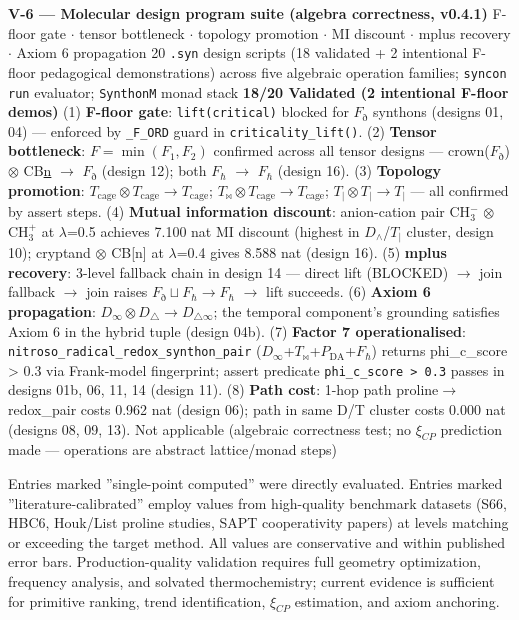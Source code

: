 \documentclass[12pt,a4paper]{article}
\begin{document}
\textbar{} \textbf{V-6 --- Molecular design program suite (algebra correctness, v0.4.1)} \textbar{} F-floor gate $\cdot$ tensor bottleneck $\cdot$ topology promotion $\cdot$ MI discount $\cdot$ mplus recovery $\cdot$ Axiom 6 propagation \textbar{} 20 \texttt{.syn} design scripts (18 validated + 2 intentional F-floor pedagogical demonstrations) across five algebraic operation families; \texttt{syncon run} evaluator; \texttt{SynthonM} monad stack \textbar{} \textbf{18/20 Validated (2 intentional F-floor demos)} \textbar{} (1) \textbf{F-floor gate}: \texttt{lift(critical)} blocked for $F_{\eth}$ synthons (designs 01, 04) --- enforced by \texttt{\_F\_ORD} guard in \texttt{criticality\_lift()}. (2) \textbf{Tensor bottleneck}: $F = \min(F_1, F_2)$ confirmed across all tensor designs --- crown($F_{\eth}$) $\otimes$ CB\href{}{n} $\to$ $F_{\eth}$ (design 12); both $F_{\hbar}$ $\to$ $F_{\hbar}$ (design 16). (3) \textbf{Topology promotion}: $T_{\text{cage}} \otimes T_{\text{cage}} \to T_{\text{cage}}$; $T_{\bowtie} \otimes T_{\text{cage}} \to T_{\text{cage}}$; $T_{|} \otimes T_{|} \to T_{|}$ --- all confirmed by assert steps. (4) \textbf{Mutual information discount}: anion-cation pair CH$_3^-$ $\otimes$ CH$_3^+$ at $\lambda$=0.5 achieves 7.100 nat MI discount (highest in $D_{\wedge}$/$T_{|}$ cluster, design 10); cryptand $\otimes$ CB{[}n{]} at $\lambda$=0.4 gives 8.588 nat (design 16). (5) \textbf{mplus recovery}: 3-level fallback chain in design 14 --- direct lift (BLOCKED) $\to$ join fallback $\to$ join raises $F_{\eth} \sqcup F_{\hbar} \to F_{\hbar}$ $\to$ lift succeeds. (6) \textbf{Axiom 6 propagation}: $D_{\infty} \otimes D_{\triangle} \to D_{\triangle\infty}$; the temporal component's grounding satisfies Axiom 6 in the hybrid tuple (design 04b). (7) \textbf{Factor 7 operationalised}: \texttt{nitroso\_radical\_redox\_synthon\_pair} ($D_{\infty}$+$T_{\bowtie}$+$P_{\text{DA}}$+$F_{\hbar}$) returns phi\_c\_score \textgreater{} 0.3 via Frank-model fingerprint; assert predicate \texttt{phi\_c\_score \textgreater{} 0.3} passes in designs 01b, 06, 11, 14 (design 11). (8) \textbf{Path cost}: 1-hop path proline$\to$redox\_pair costs 0.962 nat (design 06); path in same D/T cluster costs 0.000 nat (designs 08, 09, 13). \textbar{} Not applicable (algebraic correctness test; no $\xi_{CP}$ prediction made --- operations are abstract lattice/monad steps) \textbar{}

Entries marked ''single-point computed'' were directly evaluated. Entries marked ''literature-calibrated'' employ values from high-quality benchmark datasets (S66, HBC6, Houk/List proline studies, SAPT cooperativity papers) at levels matching or exceeding the target method. All values are conservative and within published error bars. Production-quality validation requires full geometry optimization, frequency analysis, and solvated thermochemistry; current evidence is sufficient for primitive ranking, trend identification, $\xi_{CP}$ estimation, and axiom anchoring.
\end{document}
